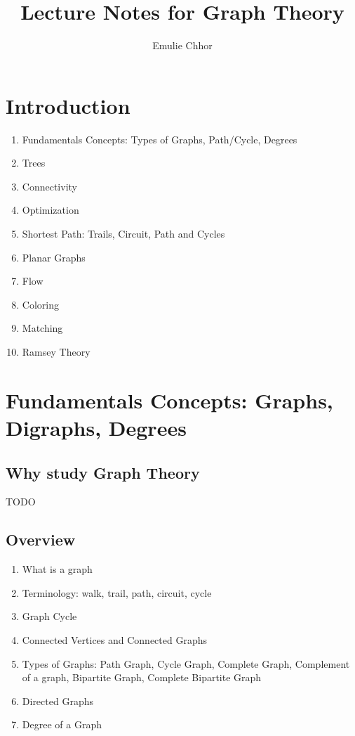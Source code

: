 \documentclass{article}
\begin{document}
\title{Lecture Notes for Graph Theory}
\author{Emulie Chhor}
\maketitle

\section*{Introduction}

\begin{enumerate}
    \item Fundamentals Concepts: Types of Graphs, Path/Cycle, Degrees
    \item Trees
    \item Connectivity
    \item Optimization
    \item Shortest Path: Trails, Circuit, Path and Cycles
    \item Planar Graphs
    \item Flow
    \item Coloring
    \item Matching
    \item Ramsey Theory
\end{enumerate}

\newtheorem{definition}{Definition}[subsection]
\newtheorem{theorem}{Theorem}[subsection]
\newtheorem{corollary}{Corollary}[subsection]
\newtheorem{lemma}[theorem]{Lemma}
\newtheorem{proposition}{Proposition}[section]
\newtheorem{axiom}{Axiome}
\newtheorem{property}{Propriété}[subsection]
\newtheorem*{remark}{Remarque}
\newtheorem*{problem}{Problème}
\newtheorem*{intuition}{Intuition}

\section{Fundamentals Concepts: Graphs, Digraphs, Degrees}

\subsection{Why study Graph Theory}%
\label{sub:Why study Graph Theory}

TODO

\subsection{Overview}%
\label{sub:Overview}

\begin{enumerate}
    \item What is a graph
    \item Terminology: walk, trail, path, circuit, cycle
    \item Graph Cycle
    \item Connected Vertices and Connected Graphs
    \item Types of Graphs: Path Graph, Cycle Graph, Complete Graph,
	Complement of a graph, Bipartite Graph, Complete Bipartite Graph
    \item Directed Graphs
    \item Degree of a Graph
\end{enumerate}
\end{document}
